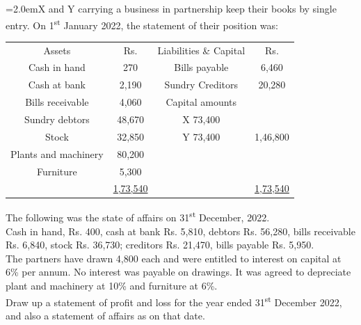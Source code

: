 \documentclass[11pt,a4paper]{article}
\newcommand{\lqn}[2]{\Needspace{6\baselineskip}\par\medskip\noindent\hangindent=2.0em\hangafter=1\makebox[2.0em][l]{\textbf{#1.}}#2\par}
\begin{document}
\lqn{11}{X and Y carrying a business in partnership keep their books by single entry. On 1\textsuperscript{st}  January 2022, the statement of their position was:\par
\par\smallskip\noindent\hspace*{1.2em}\begin{tabular}{|cccc|}
\hline
Assets & Rs. & Liabilities \& Capital & Rs. \\
Cash in hand & 270 & Bills payable & 6,460 \\
Cash at bank & 2,190 & Sundry Creditors & 20,280 \\
Bills receivable & 4,060 & Capital amounts &  \\
Sundry debtors & 48,670 & X                   73,400 &  \\
Stock & 32,850 & Y                   73,400 & 1,46,800 \\
Plants and machinery & 80,200 &  &  \\
Furniture & 5,300 &  &  \\
 & \underline{1,73,540} &  & \underline{1,73,540} \\
\hline
\end{tabular}\par\smallskip
The following was the state of affairs on 31\textsuperscript{st}  December, 2022.\\
Cash in hand, Rs. 400, cash at bank Rs. 5,810, debtors Rs. 56,280, bills receivable Rs. 6,840, stock Rs. 36,730; creditors Rs. 21,470, bills payable Rs. 5,950.\\
The partners have drawn 4,800 each and were entitled to interest on capital at 6\% per annum. No interest was payable on drawings. It was agreed to depreciate plant and machinery at 10\% and furniture at 6\%.\\
Draw up a statement of profit and loss for the year ended 31\textsuperscript{st}  December 2022, and also a statement of affairs as on that date.\par
}
\end{document}
